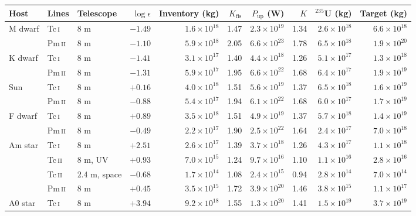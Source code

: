 \begin{tabular}{lllrrrrrrr}
\toprule
Host & Lines & Telescope & $\log\epsilon$ & Inventory (kg) & $K_\mathrm{fis}$ & $P_\mathrm{up}$ (W) & $K$ & $^{235}$U (kg) & Target (kg) \\
\midrule
M dwarf & Tc\,\textsc{i} & 8 m & $-1.49$ & $1.6\times10^{18}$ & 1.47 & $2.3\times10^{19}$ & 1.34 & $2.6\times10^{18}$ & $6.6\times10^{18}$ \\
 & Pm\,\textsc{ii} & 8 m & $-1.10$ & $5.9\times10^{18}$ & 2.05 & $6.6\times10^{23}$ & 1.78 & $6.5\times10^{18}$ & $1.9\times10^{20}$ \\
\addlinespace
K dwarf & Tc\,\textsc{i} & 8 m & $-1.41$ & $3.1\times10^{17}$ & 1.40 & $4.4\times10^{18}$ & 1.26 & $5.1\times10^{17}$ & $1.3\times10^{18}$ \\
 & Pm\,\textsc{ii} & 8 m & $-1.31$ & $5.9\times10^{17}$ & 1.95 & $6.6\times10^{22}$ & 1.68 & $6.4\times10^{17}$ & $1.9\times10^{19}$ \\
\addlinespace
Sun & Tc\,\textsc{i} & 8 m & $+0.16$ & $4.0\times10^{18}$ & 1.51 & $5.6\times10^{19}$ & 1.37 & $6.5\times10^{18}$ & $1.6\times10^{19}$ \\
 & Pm\,\textsc{ii} & 8 m & $-0.88$ & $5.4\times10^{17}$ & 1.94 & $6.1\times10^{22}$ & 1.68 & $6.0\times10^{17}$ & $1.7\times10^{19}$ \\
\addlinespace
F dwarf & Tc\,\textsc{i} & 8 m & $+0.89$ & $3.5\times10^{18}$ & 1.51 & $4.9\times10^{19}$ & 1.37 & $5.7\times10^{18}$ & $1.4\times10^{19}$ \\
 & Pm\,\textsc{ii} & 8 m & $-0.49$ & $2.2\times10^{17}$ & 1.90 & $2.5\times10^{22}$ & 1.64 & $2.4\times10^{17}$ & $7.0\times10^{18}$ \\
\addlinespace
Am star & Tc\,\textsc{i} & 8 m & $+2.51$ & $2.6\times10^{17}$ & 1.39 & $3.7\times10^{18}$ & 1.26 & $4.3\times10^{17}$ & $1.1\times10^{18}$ \\
 & Tc\,\textsc{ii} & 8 m, UV & $+0.93$ & $7.0\times10^{15}$ & 1.24 & $9.7\times10^{16}$ & 1.10 & $1.1\times10^{16}$ & $2.8\times10^{16}$ \\
 & Tc\,\textsc{ii} & 2.4 m, space & $-0.68$ & $1.7\times10^{14}$ & 1.08 & $2.4\times10^{15}$ & 0.94 & $2.8\times10^{14}$ & $7.0\times10^{14}$ \\
 & Pm\,\textsc{ii} & 8 m & $+0.45$ & $3.5\times10^{15}$ & 1.72 & $3.9\times10^{20}$ & 1.46 & $3.8\times10^{15}$ & $1.1\times10^{17}$ \\
\addlinespace
A0 star & Tc\,\textsc{i} & 8 m & $+3.94$ & $9.2\times10^{18}$ & 1.55 & $1.3\times10^{20}$ & 1.41 & $1.5\times10^{19}$ & $3.7\times10^{19}$ \\

\end{tabular}
